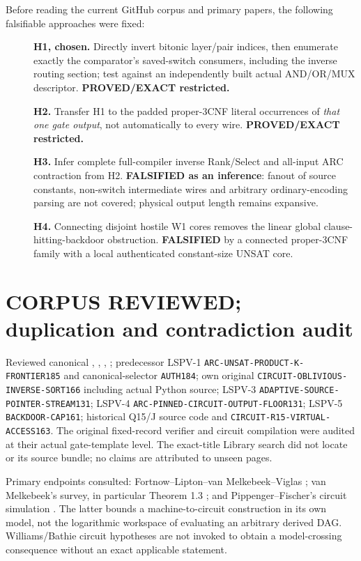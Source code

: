 \documentclass[11pt]{article}
\begin{document}
Before reading the current GitHub corpus and primary papers, the
following falsifiable approaches were fixed:
\begin{description}
\item[] \textbf{H1, chosen.} Directly invert bitonic layer/pair indices,
then enumerate exactly the comparator's saved-switch consumers, including
the inverse routing section; test against an independently built
actual AND/OR/MUX descriptor. \textbf{PROVED/EXACT restricted.}
\item[] \textbf{H2.} Transfer H1 to the padded proper-3CNF literal
occurrences of \emph{that one gate output}, not automatically to
every wire. \textbf{PROVED/EXACT restricted.}
\item[] \textbf{H3.} Infer complete full-compiler inverse
Rank/Select and all-input ARC contraction from H2. \textbf{FALSIFIED
as an inference}: fanout of source constants, non-switch intermediate
wires and arbitrary ordinary-encoding parsing are not covered; physical
output length remains expansive.
\item[] \textbf{H4.} Connecting disjoint hostile W1 cores removes
the linear global clause-hitting-backdoor obstruction. \textbf{FALSIFIED}
by a connected proper-3CNF family with a local authenticated
constant-size UNSAT core.
\end{description}

\section{CORPUS REVIEWED; duplication and contradiction audit}
Reviewed canonical , , ,
; predecessor LSPV-1
\texttt{ARC-UNSAT-PRODUCT-K-FRONTIER185} and canonical-selector
\texttt{AUTH184}; own original \texttt{CIRCUIT-OBLIVIOUS-INVERSE-SORT166}
including actual Python source; LSPV-3 \texttt{ADAPTIVE-SOURCE-POINTER-STREAM131};
LSPV-4 \texttt{ARC-PINNED-CIRCUIT-OUTPUT-FLOOR131};
LSPV-5 \texttt{BACKDOOR-CAP161}; historical Q15/J source code and
\texttt{CIRCUIT-R15-VIRTUAL-ACCESS163}. The original fixed-record verifier
and circuit compilation were audited at their actual gate-template level.
The exact-title Library search did not locate
 or its source bundle;
no claims are attributed to unseen pages.

Primary endpoints consulted: Fortnow--Lipton--van Melkebeek--Viglas
\cite{flmv}; van Melkebeek's survey, in particular Theorem 1.3
\cite{vm}; and Pippenger--Fischer's circuit simulation \cite{pf}.
The latter bounds a machine-to-circuit construction in its own model,
not the logarithmic workspace of evaluating an arbitrary derived DAG.
Williams/Bathie circuit hypotheses are not invoked to obtain a
model-crossing consequence without an exact applicable statement.
\end{document}
